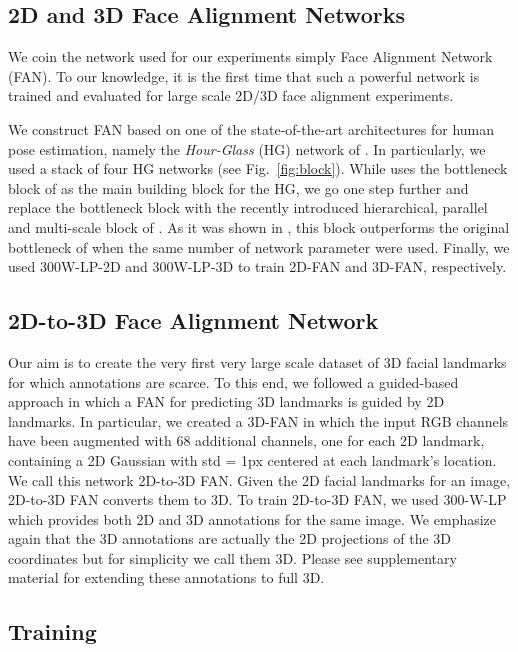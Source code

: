 	\subsection{2D and 3D Face Alignment Networks} 

	We coin the network used for our experiments simply Face Alignment Network (FAN). To our knowledge, it is the first time that such a powerful network is trained and evaluated for large scale 2D/3D face alignment experiments. 

	We construct FAN based on one of the state-of-the-art architectures for human pose estimation, namely the \textit{Hour-Glass} (HG) network of \cite{newell2016stacked}. In particularly, we used a stack of four HG networks (see Fig.~\ref{fig:block}). While \cite{newell2016stacked} uses the bottleneck block of \cite{he2016deep} as the main building block for the HG, we go one step further and replace the bottleneck block with the recently introduced hierarchical, parallel and multi-scale block of \cite{bulat2017binarized}. As it was shown in \cite{bulat2017binarized}, this block outperforms the original bottleneck of \cite{he2016deep} when the same number of network parameter were used. Finally, we used 300W-LP-2D and 300W-LP-3D to train 2D-FAN and 3D-FAN, respectively. 

	\subsection{2D-to-3D Face Alignment Network} \label{sec:2D-3D}

	Our aim is to create the very first very large scale dataset of 3D facial landmarks for which annotations are scarce. To this end, we followed a guided-based approach in which a FAN for predicting 3D landmarks is guided by 2D landmarks. In particular, we created a 3D-FAN in which the input RGB channels have been augmented with 68 additional channels, one for each 2D landmark, containing a 2D Gaussian with std = 1px centered at each landmark's location. We call this network 2D-to-3D FAN. Given the 2D facial landmarks for an image, 2D-to-3D FAN converts them to 3D.  To train 2D-to-3D FAN, we used 300-W-LP which provides both 2D and 3D annotations for the same image. We emphasize again that the 3D annotations are actually the 2D projections of the 3D coordinates but for simplicity we call them 3D. Please see supplementary material for extending these annotations to full 3D. 

	\subsection{Training}

